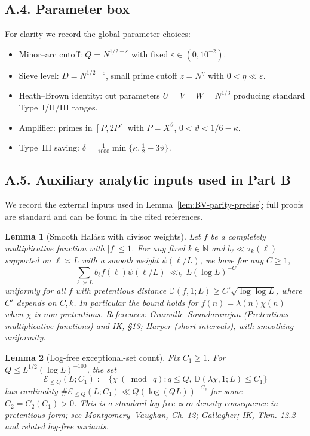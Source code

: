 \documentclass[11pt]{article}
\newtheorem{lemma}{Lemma}[section]
\theoremstyle{definition}
\theoremstyle{remark}
\begin{document}
\subsection*{A.4. Parameter box}

For clarity we record the global parameter choices:
\begin{itemize}
\item Minor--arc cutoff: $Q=N^{1/2-\varepsilon}$ with fixed $\varepsilon\in(0,10^{-2})$.
\item Sieve level: $D=N^{1/2-\varepsilon}$, small prime cutoff $z=N^\eta$ with $0<\eta\ll\varepsilon$.
\item Heath--Brown identity: cut parameters $U=V=W=N^{1/3}$ producing standard Type~I/II/III ranges.
\item Amplifier: primes in $[P,2P]$ with $P=X^\vartheta$, $0<\vartheta<1/6-\kappa$.
\item Type~III saving: $\delta=\tfrac{1}{1000}\min\{\kappa,\tfrac12-3\vartheta\}$.
\end{itemize}
\subsection*{A.5. Auxiliary analytic inputs used in Part B}

We record the external inputs used in Lemma~\ref{lem:BV-parity-precise}; full proofs are standard and can be found in the cited references.

\begin{lemma}[Smooth Hal\'asz with divisor weights]\label{lem:halasz-smooth}
Let $f$ be a completely multiplicative function with $|f|\le 1$. For any fixed $k\in\mathbb N$ and $b_\ell\ll \tau_k(\ell)$ supported on $\ell\asymp L$ with a smooth weight $\psi(\ell/L)$, we have for any $C\ge 1$,
\[
\sum_{\ell\asymp L} b_\ell f(\ell)\psi(\ell/L)\ \ll_{k}\ L(\log L)^{-C}
\]
uniformly for all $f$ with pretentious distance $\mathbb D(f,1;L)\ge C'\sqrt{\log\log L}$, where $C'$ depends on $C,k$. In particular the bound holds for $f(n)=\lambda(n)\chi(n)$ when $\chi$ is non-pretentious. References: Granville--Soundararajan (Pretentious multiplicative functions) and IK, §13; Harper (short intervals), with smoothing uniformity.
\end{lemma}

\begin{lemma}[Log-free exceptional-set count]\label{lem:logfree-density}
Fix $C_1\ge 1$. For $Q\le L^{1/2}(\log L)^{-100}$, the set
\[
\mathcal E_{\le Q}(L;C_1):=\{\chi\ (\bmod\ q): q\le Q,\ \mathbb D(\lambda\chi,1;L)\le C_1\}
\]
has cardinality $\#\mathcal E_{\le Q}(L;C_1)\ll Q(\log (QL))^{-C_2}$ for some $C_2=C_2(C_1)>0$. This is a standard log-free zero-density consequence in pretentious form; see Montgomery--Vaughan, Ch. 12; Gallagher; IK, Thm. 12.2 and related log-free variants.
\end{lemma}
\end{document}

